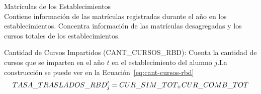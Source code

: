 \begin{longdescription}
\begin{itemize}
            \end{itemize}   
        \item[Matrículas de los Establecimientos] \hfill \\
        Contiene información de las matrículas registradas durante el año en los establecimientos. Concentra información de las matrículas desagregadas y los cursos totales de los establecimientos.
            \begin{longdescription}
                \item[Cantidad de Cursos Impartidos]
                (CANT\_CURSOS\_RBD): Cuenta la cantidad de cursos que se imparten en el año $t$ en el establecimiento del alumno $j$.La construcción se puede ver en la Ecuación~\ref{eq:cant-cursos-rbd}
              \begin{equation}
              \centering
                TASA\_TRASLADOS\_RBD_{j}^{t} = CUR\_SIM\_TOT_ + CUR\_COMB\_TOT
                \label{eq:cant-cursos-rbd}
              \end{equation}
                

\end{longdescription}
\end{longdescription}

